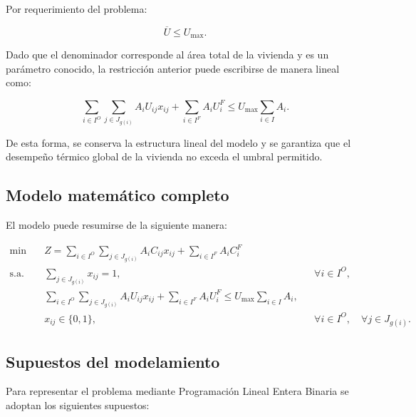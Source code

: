 Por requerimiento del problema:

\[
\overline{U}\leq U_{\max}.
\]

Dado que el denominador corresponde al área total de la vivienda y es un
parámetro conocido, la restricción anterior puede escribirse de manera
lineal como:

\[
\sum_{i\in I^{O}}
\sum_{j\in J_{g(i)}}
A_iU_{ij}x_{ij}
+
\sum_{i\in I^{F}}
A_iU_i^{F}
\leq
U_{\max}
\sum_{i\in I}A_i.
\]

De esta forma, se conserva la estructura lineal del modelo y se garantiza que
el desempeño térmico global de la vivienda no exceda el umbral permitido.

\subsection{Modelo matemático completo}

El modelo puede resumirse de la siguiente manera:

\[
\boxed{
\begin{aligned}
\min \quad
& Z=
\sum_{i\in I^{O}}
\sum_{j\in J_{g(i)}}
A_iC_{ij}x_{ij}
+
\sum_{i\in I^{F}}
A_iC_i^{F}
\\[2mm]
\text{s.a.}\quad
& \sum_{j\in J_{g(i)}}x_{ij}=1,
&& \forall i\in I^{O},
\\[2mm]
&
\sum_{i\in I^{O}}
\sum_{j\in J_{g(i)}}
A_iU_{ij}x_{ij}
+
\sum_{i\in I^{F}}
A_iU_i^{F}
\leq
U_{\max}
\sum_{i\in I}A_i,
\\[2mm]
& x_{ij}\in\{0,1\},
&& \forall i\in I^{O},
\quad \forall j\in J_{g(i)}.
\end{aligned}
}
\]

\subsection{Supuestos del modelamiento}

Para representar el problema mediante Programación Lineal Entera Binaria se
adoptan los siguientes supuestos:

